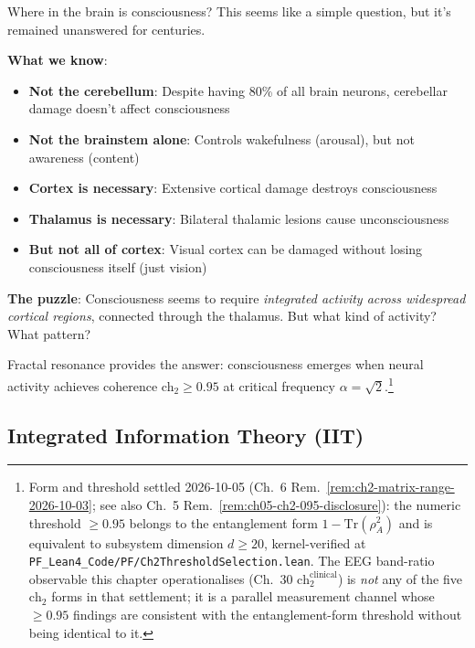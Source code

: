 \begin{intuitive}
Where in the brain is consciousness? This seems like a simple question, but it's remained unanswered for centuries.

\textbf{What we know}:
\begin{itemize}
\item \textbf{Not the cerebellum}: Despite having 80\% of all brain neurons, cerebellar damage doesn't affect consciousness
\item \textbf{Not the brainstem alone}: Controls wakefulness (arousal), but not awareness (content)
\item \textbf{Cortex is necessary}: Extensive cortical damage destroys consciousness
\item \textbf{Thalamus is necessary}: Bilateral thalamic lesions cause unconsciousness
\item \textbf{But not all of cortex}: Visual cortex can be damaged without losing consciousness itself (just vision)
\end{itemize}

\textbf{The puzzle}: Consciousness seems to require \textit{integrated activity across widespread cortical regions}, connected through the thalamus. But what kind of activity? What pattern?

Fractal resonance provides the answer: consciousness emerges when neural activity achieves coherence ch$_2 \geq 0.95$ at critical frequency $\alpha = \sqrt{2}$.\footnote{Form and threshold settled 2026-10-05 (Ch.~6 Rem.~\ref{rem:ch2-matrix-range-2026-10-03}; see also Ch.~5 Rem.~\ref{rem:ch05-ch2-095-disclosure}): the numeric threshold $\geq 0.95$ belongs to the entanglement form $1 - \mathrm{Tr}(\rho_A^2)$ and is equivalent to subsystem dimension $d \geq 20$, kernel-verified at \texttt{PF\_Lean4\_Code/PF/Ch2ThresholdSelection.lean}. The EEG band-ratio observable this chapter operationalises (Ch.~30 $\mathrm{ch}_2^{\mathrm{clinical}}$) is \emph{not} any of the five $\mathrm{ch}_2$ forms in that settlement; it is a parallel measurement channel whose $\geq 0.95$ findings are consistent with the entanglement-form threshold without being identical to it.}
\end{intuitive}

\subsection{Integrated Information Theory (IIT)}

